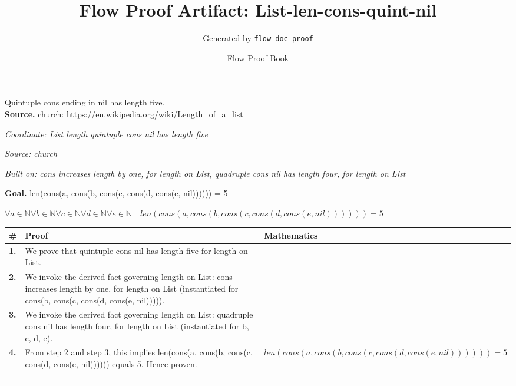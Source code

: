 \documentclass[11pt]{article}
\title{Flow Proof Artifact: List-len-cons-quint-nil}
\author{Generated by \texttt{flow doc proof}}
\date{Flow Proof Book}
\theoremstyle{definition}
\begin{document}
\maketitle
Quintuple cons ending in nil has length five.\\[0.5em]
\textbf{Source.} church: https://en.wikipedia.org/wiki/Length\_of\_a\_list\\[0.5em]
\bigskip
{}\par
\smallskip\noindent\textit{Coordinate: List \cdot length \cdot quintuple cons nil has length five}\par
\smallskip\noindent\textit{Source: church}\par
\smallskip\noindent\textit{Built on: cons increases length by one, for length on List, quadruple cons nil has length four, for length on List}\par
\medskip
\noindent\textbf{Goal.} len(cons(a, cons(b, cons(c, cons(d, cons(e, nil)))))) = 5\par
\noindent$\displaystyle \forall a \in \mathbb{N} \forall b \in \mathbb{N} \forall c \in \mathbb{N} \forall d \in \mathbb{N} \forall e \in \mathbb{N}\quad len(cons(a, cons(b, cons(c, cons(d, cons(e, nil)))))) = 5$\par
\medskip
\noindent
\begin{tabular}{@{} >{\raggedright\arraybackslash}p{} >{\raggedright\arraybackslash}p{} >{\raggedleft\arraybackslash}p{} @{}}
\textbf{\#} & \textbf{Proof} & \textbf{Mathematics} \\
\midrule
\textbf{1.} & We prove that quintuple cons nil has length five for length on List. & \\[0.45em]
\textbf{2.} & We invoke the derived fact governing length on List: cons increases length by one, for length on List (instantiated for cons(b, cons(c, cons(d, cons(e, nil))))). & \\[0.45em]
\textbf{3.} & We invoke the derived fact governing length on List: quadruple cons nil has length four, for length on List (instantiated for b, c, d, e). & \\[0.45em]
\textbf{4.} & From step 2 and step 3, this implies len(cons(a, cons(b, cons(c, cons(d, cons(e, nil)))))) equals 5. Hence proven. & $\displaystyle len(cons(a, cons(b, cons(c, cons(d, cons(e, nil)))))) = 5$ \\[0.45em]
\bottomrule
\end{tabular}
\label{thm:List-length-quintuple_cons_nil_has_length_five}
\par\medskip\hrule
\end{document}
